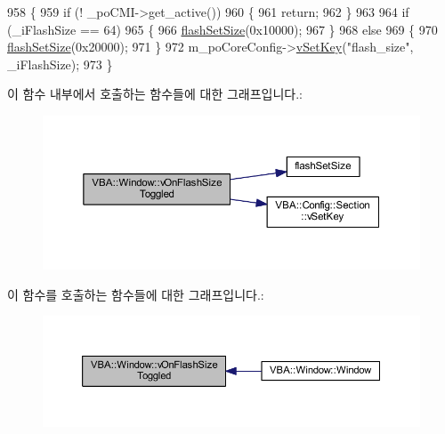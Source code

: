 \begin{DoxyCode}
958 \{
959   \textcolor{keywordflow}{if} (! \_poCMI->get\_active())
960   \{
961     \textcolor{keywordflow}{return};
962   \}
963 
964   \textcolor{keywordflow}{if} (\_iFlashSize == 64)
965   \{
966     \mbox{\hyperlink{_flash_8cpp_a4d0a651a0b5a03da845c2fd023bef403}{flashSetSize}}(0x10000);
967   \}
968   \textcolor{keywordflow}{else}
969   \{
970     \mbox{\hyperlink{_flash_8cpp_a4d0a651a0b5a03da845c2fd023bef403}{flashSetSize}}(0x20000);
971   \}
972   m\_poCoreConfig->\mbox{\hyperlink{class_v_b_a_1_1_config_1_1_section_a57e1b95cbea40db71c093381beff4b0e}{vSetKey}}(\textcolor{stringliteral}{"flash\_size"}, \_iFlashSize);
973 \}
\end{DoxyCode}
이 함수 내부에서 호출하는 함수들에 대한 그래프입니다.\+:
\nopagebreak
\begin{figure}[H]
\begin{center}
\leavevmode
\includegraphics[width=350pt]{class_v_b_a_1_1_window_a592d046d6e85921562d26285387cc45a_cgraph}
\end{center}
\end{figure}
이 함수를 호출하는 함수들에 대한 그래프입니다.\+:
\nopagebreak
\begin{figure}[H]
\begin{center}
\leavevmode
\includegraphics[width=350pt]{class_v_b_a_1_1_window_a592d046d6e85921562d26285387cc45a_icgraph}
\end{center}
\end{figure}
\mbox{\label{class_v_b_a_1_1_window_a1d969d55fcb1a69d13d3a29c9365e699}} 
